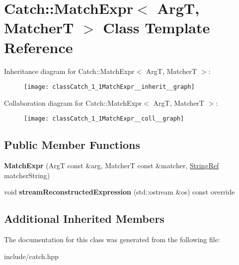 \hypertarget{classCatch_1_1MatchExpr}{}\section{Catch\+:\+:Match\+Expr$<$ ArgT, MatcherT $>$ Class Template Reference}
\label{classCatch_1_1MatchExpr}


Inheritance diagram for Catch\+:\+:Match\+Expr$<$ ArgT, MatcherT $>$\+:\nopagebreak
\begin{figure}[H]
\begin{center}
\leavevmode
\texttt{[image: classCatch\_1\_1MatchExpr\_\_inherit\_\_graph]}
\end{center}
\end{figure}


Collaboration diagram for Catch\+:\+:Match\+Expr$<$ ArgT, MatcherT $>$\+:\nopagebreak
\begin{figure}[H]
\begin{center}
\leavevmode
\texttt{[image: classCatch\_1\_1MatchExpr\_\_coll\_\_graph]}
\end{center}
\end{figure}
\subsection*{Public Member Functions}
\begin{DoxyCompactItemize}
\item 
{\bfseries Match\+Expr} (ArgT const \&arg, MatcherT const \&matcher, \hyperlink{classCatch_1_1StringRef}{String\+Ref} matcher\+String)\hypertarget{classCatch_1_1MatchExpr_ab5b9ecc4fb9e91f5f48756e75affe93d}{}\label{classCatch_1_1MatchExpr_ab5b9ecc4fb9e91f5f48756e75affe93d}

\item 
void {\bfseries stream\+Reconstructed\+Expression} (std\+::ostream \&os) const override\hypertarget{classCatch_1_1MatchExpr_ad3e41adb597750b2219bb37e51185629}{}\label{classCatch_1_1MatchExpr_ad3e41adb597750b2219bb37e51185629}

\end{DoxyCompactItemize}
\subsection*{Additional Inherited Members}


The documentation for this class was generated from the following file\+:\begin{DoxyCompactItemize}
\item 
include/catch.\+hpp\end{DoxyCompactItemize}
